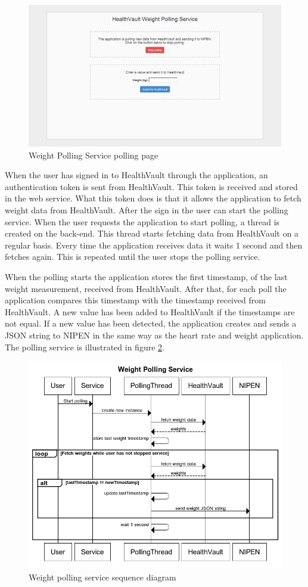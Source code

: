 \begin{figure}[H]
\centering
\includegraphics[scale=0.4]{../Figures/webservice-polling.png}
\caption{Weight Polling Service polling page}
\label{figure:webservice-polling}
\end{figure}

When the user has signed in to HealthVault through the application, an authentication token is sent from HealthVault.
This token is received and stored in the web service.
What this token does is that it allows the application to fetch weight data from HealthVault.
After the sign in the user can start the polling service.
When the user requests the application to start polling, a thread is created on the back-end.
This thread starts fetching data from HealthVault on a regular basis.
Every time the application receives data it waits 1 second and then fetches again.
This is repeated until the user stops the polling service.

When the polling starts the application stores the first timestamp, of the last weight measurement, received from HealthVault.
After that, for each poll the application compares this timestamp with the timestamp received from HealthVault.
A new value has been added to HealthVault if the timestamps are not equal.
If a new value has been detected, the application creates and sends a JSON string to NIPEN in the same way as the heart rate and weight application.
The polling service is illustrated in figure \ref{figure:weight-polling-service}.

\begin{figure}[h]
\centering
\includegraphics[scale=0.8]{../Figures/weight-polling-service.png}
\caption{Weight polling service sequence diagram}
\label{figure:weight-polling-service}
\end{figure}
